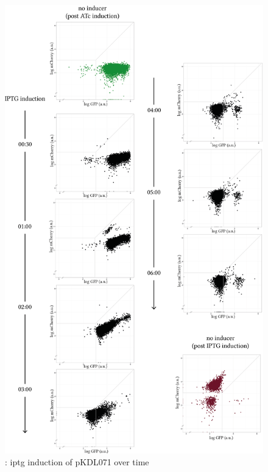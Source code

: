 \begin{figure}[tb]
	\begin{center}
\includegraphics[scale=0.7]{chapterCharacterisation/images/pKDL071_iptg_time.png}
\caption[LoF caption]{\label{fig:switch_timecourse_iptg}: \acrshort{iptg} induction of pKDL071 over time}
\end{center}
\end{figure}
\clearpage


%

